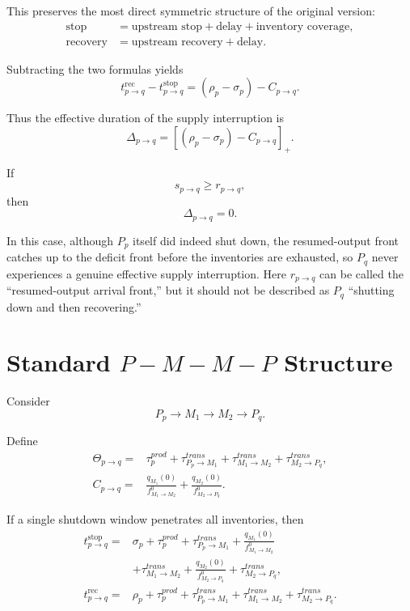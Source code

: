 \documentclass[11pt]{article}
\begin{document}
This preserves the most direct symmetric structure of the original version:
\[
\boxed{
\begin{aligned}
\text{stop}
&=
\text{upstream stop}
+\text{delay}
+\text{inventory coverage},
\\
\text{recovery}
&=
\text{upstream recovery}
+\text{delay}.
\end{aligned}
}
\tag{7}
\]

Subtracting the two formulas yields
\[
\boxed{
t_{p\to q}^{\mathrm{rec}}
-
t_{p\to q}^{\mathrm{stop}}
=
(\rho_p-\sigma_p)-C_{p\to q}.
}
\tag{8}
\]

Thus the effective duration of the supply interruption is
\[
\boxed{
\Delta_{p\to q}
=
\left[
(\rho_p-\sigma_p)-C_{p\to q}
\right]_+.
}
\tag{9}
\]

If
\[
s_{p\to q}\ge r_{p\to q},
\]
then
\[
\boxed{
\Delta_{p\to q}=0.
}
\tag{10}
\]

In this case, although \(P_p\) itself did indeed shut down,
the resumed-output front catches up to the deficit front before the inventories are exhausted,
so \(P_q\) never experiences a genuine effective supply interruption.
Here \(r_{p\to q}\) can be called the ``resumed-output arrival front,''
but it should not be described as \(P_q\) ``shutting down and then recovering.''

\section{Standard \(P-M-M-P\) Structure}

Consider
\[
P_p\rightarrow M_1\rightarrow M_2\rightarrow P_q.
\]

Define
\[
\boxed{
\begin{aligned}
\Theta_{p\to q}
={}&
\tau_p^{prod}
+\tau_{P_p\to M_1}^{trans}
+\tau_{M_1\to M_2}^{trans}
+\tau_{M_2\to P_q}^{trans},
\\[1mm]
C_{p\to q}
={}&
\frac{q_{M_1}(0)}
     {f_{M_1\to M_2}^{0}}
+
\frac{q_{M_2}(0)}
     {f_{M_2\to P_q}^{0}}.
\end{aligned}
}
\tag{11}
\]

If a single shutdown window penetrates all inventories, then
\[
\boxed{
\begin{aligned}
t_{p\to q}^{\mathrm{stop}}
={}&
\sigma_p
+\tau_p^{prod}
+\tau_{P_p\to M_1}^{trans}
+\frac{q_{M_1}(0)}{f_{M_1\to M_2}^{0}}
\\
&+
\tau_{M_1\to M_2}^{trans}
+\frac{q_{M_2}(0)}{f_{M_2\to P_q}^{0}}
+\tau_{M_2\to P_q}^{trans},
\\[2mm]
t_{p\to q}^{\mathrm{rec}}
={}&
\rho_p
+\tau_p^{prod}
+\tau_{P_p\to M_1}^{trans}
+\tau_{M_1\to M_2}^{trans}
+\tau_{M_2\to P_q}^{trans}.
\end{aligned}
}
\tag{12}
\]
\end{document}
